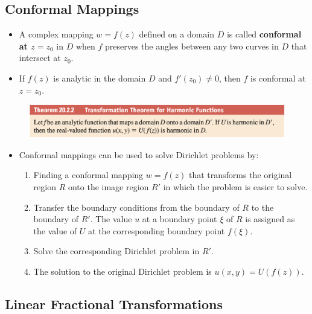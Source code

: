 \documentclass{article}
\begin{document}
\subsection{Conformal Mappings}

\begin{itemize}
  \item A complex mapping $w = f(z)$ defined on a domain $D$ is called \textbf{conformal at $z = z_0$} in $D$ when $f$ preserves the angles between any two curves in $D$ that intersect at $z_0$.

  \item If $f(z)$ is analytic in the domain $D$ and $f'(z_0) \ne 0$, then $f$ is conformal at $z = z_0$.
\end{itemize}

\begin{figure}[H]
  \centering
  \includegraphics[width=\textwidth]{transformation-theorem-for-harmonic-functions}
\end{figure}

\begin{itemize}
  \item Conformal mappings can be used to solve Dirichlet problems by:

        \begin{enumerate}
          \item Finding a conformal mapping $w = f(z)$ that transforms the original region $R$ onto the image region $R'$ in which the problem is easier to solve.

          \item Transfer the boundary conditions from the boundary of $R$ to the boundary of $R'$. The value $u$ at a boundary point $\xi$ of $R$ is assigned as the value of $U$ at the corresponding boundary point $f(\xi)$.

          \item Solve the corresponding Dirichlet problem in $R'$.

          \item The solution to the original Dirichlet problem is $u(x, y) = U(f(z))$.
        \end{enumerate}
\end{itemize}

\subsection{Linear Fractional Transformations}
\end{document}
